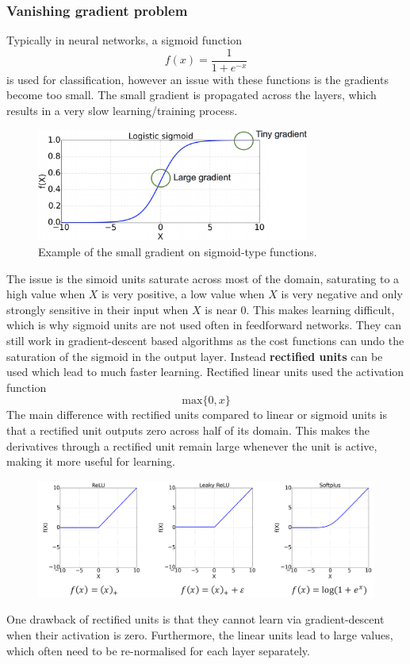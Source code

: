 \documentclass[CS5104-Notes.tex]{subfiles}
\begin{document}
\subsubsection{Vanishing gradient problem}
Typically in neural networks, a sigmoid function
\begin{equation}
f(x) = \frac{1}{1 + e^{-x}}
\end{equation}
is used for classification, however an issue with these functions is the gradients become too small. The small gradient is propagated across the layers, which results in a very slow learning/training process.
\begin{figure}[H]
  \centering
  \includegraphics[width=0.8\textwidth, keepaspectratio]{imgs/vanishing-gradient-problem.png}
  \caption{Example of the small gradient on sigmoid-type functions.}
\end{figure}
\noindent
The issue is the simoid units saturate across most of the domain, saturating to a high value when $X$ is very positive, a low value when $X$ is very negative and only strongly sensitive in their input when $X$ is near 0. This makes learning difficult, which is why sigmoid units are not used often in feedforward networks. They can still work in gradient-descent based algorithms as the cost functions can undo the saturation of the sigmoid in the output layer.
\n
Instead \textbf{rectified units} can be used which lead to much faster learning. Rectified linear units used the activation function
\begin{equation}
\text{max}\{0, x\}
\end{equation}
The main difference with rectified units compared to linear or sigmoid units is that a rectified unit outputs zero across half of its domain. This makes the derivatives through a rectified unit remain large whenever the unit is active, making it more useful for learning.
\begin{figure}[H]
  \centering
  \includegraphics[width=1\textwidth, keepaspectratio]{imgs/rectified-units.png}
\end{figure}
\noindent
One drawback of rectified units is that they cannot learn via gradient-descent when their activation is zero. Furthermore, the linear units lead to large values, which often need to be re-normalised for each layer separately.
\end{document}
